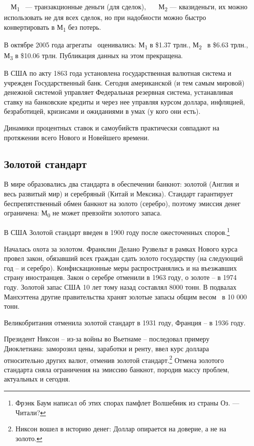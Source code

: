 \ \ М\textsubscript{1 }\ — транзакционные деньги (для сделок), \ \ \ М\textsubscript{2} — квазиденьги, их можно
использовать не для всех сделок, но при надобности можно быстро конвертировать в М\textsubscript{1} без потерь.


В октябре 2005 года агрегаты \ оценивались: М\textsubscript{1} в \$1.37 трлн., М\textsubscript{2} \ в \$6.63 трлн.,
М\textsubscript{3} в \$10.06 трлн. Публикация данных на этом прекращена.


В США по акту 1863 года установлена государственная валютная система и учрежден Государственный банк. Сегодня
американской (и тем самым мировой) денежной системой управляет Федеральная резервная система, устанавливая ставку на
банковские кредиты и через нее управляя курсом доллара, инфляцией, безработицей, кризисами и ожиданиями в умах (у кого
они есть).


Динамики процентных ставок и самоубийств практически совпадают на протяжении всего Нового и Новейшего времени.

\subsection[Золотой стандарт]{Золотой стандарт}

В мире образовались два стандарта в обеспечении банкнот: золотой (Англия и \flqq весь развитый
мир\frqq) и серебряный (Китай и Мексика). Стандарт гарантирует беспрепятственный обмен банкнот на золото
(серебро), поэтому эмиссия денег ограничена: М\textsubscript{0} не может превзойти золотого запаса.


В США Золотой стандарт введен в 1900 году после ожесточенных споров.\footnote{Фрэнк Баум написал об этих
спорах памфлет \flqq Волшебник из страны Оз\frqq. — Читали?}


Началась охота за золотом. Франклин Делано Рузвельт в рамках Нового курса провел закон, обязавший всех граждан сдать
золото государству (на следующий год – и серебро). Конфискационные меры распространялись и на въезжавших страну
иностранцев. Закон о серебре отменили в 1963 году, о золоте – в 1974 году. Золотой запас США 10 лет тому назад
составлял 8000 тонн. В подвалах Манхэттена другие правительства хранят золотые запасы общим весом \ в 10 000 тонн.


Великобритания отменила золотой стандарт в 1931 году, Франция – в 1936 году.


Президент Никсон – из-за войны во Вьетнаме – последовал примеру Диоклетиана: заморозил цены, заработки и ренту, ввел
курс доллара относительно других валют, отменив золотой стандарт.\footnote{Никсон вошел в историю
денег: \flqq Доллар опирается на доверие, а не на золото\frqq.} Отмена золотого стандарта сняла
ограничения на эмиссию банкнот, породив массу проблем, актуальных и сегодня.


